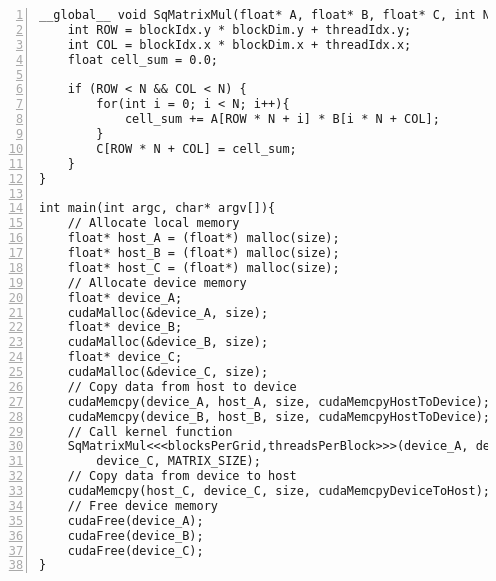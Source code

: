 \begin{lstlisting}[style=cpp,caption={Kernel Function of Matrix Multiplication},label={lst:CUDA_EX},numbers=left]
__global__ void SqMatrixMul(float* A, float* B, float* C, int N) {
    int ROW = blockIdx.y * blockDim.y + threadIdx.y;
    int COL = blockIdx.x * blockDim.x + threadIdx.x;
    float cell_sum = 0.0;

    if (ROW < N && COL < N) {
        for(int i = 0; i < N; i++){
            cell_sum += A[ROW * N + i] * B[i * N + COL];
        }
        C[ROW * N + COL] = cell_sum;
    }
}

int main(int argc, char* argv[]){
    // Allocate local memory
    float* host_A = (float*) malloc(size);
    float* host_B = (float*) malloc(size);
    float* host_C = (float*) malloc(size);
    // Allocate device memory
    float* device_A;
    cudaMalloc(&device_A, size);
    float* device_B;
    cudaMalloc(&device_B, size);
    float* device_C;
    cudaMalloc(&device_C, size);
    // Copy data from host to device
    cudaMemcpy(device_A, host_A, size, cudaMemcpyHostToDevice);
    cudaMemcpy(device_B, host_B, size, cudaMemcpyHostToDevice);
    // Call kernel function
    SqMatrixMul<<<blocksPerGrid,threadsPerBlock>>>(device_A, device_B,
		device_C, MATRIX_SIZE);      
    // Copy data from device to host
    cudaMemcpy(host_C, device_C, size, cudaMemcpyDeviceToHost);
    // Free device memory
    cudaFree(device_A);
    cudaFree(device_B);
    cudaFree(device_C);
}
\end{lstlisting}
